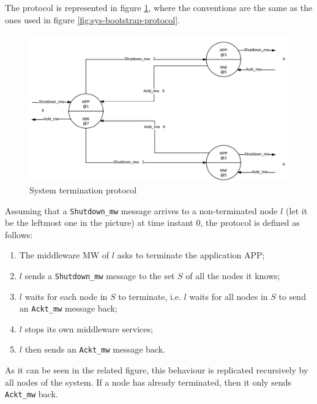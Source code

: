 The protocol is represented in figure \ref{fig:sys-termination-protocol}, where
the conventions are the same as the ones used in figure
\ref{fig:sys-bootstrap-protocol}.

\begin{figure}[H]
  \centering
  \includegraphics[width=\columnwidth]{sections/images/solution/termination.pdf}
  \caption{System termination protocol}
  \label{fig:sys-termination-protocol}
\end{figure}

Assuming that a \texttt{Shutdown\_mw} message arrives to a non-terminated node
$l$ (let it be the leftmost one in the picture) at time instant 0, the protocol
is defined as follows:

\begin{enumerate}
  \item The middleware MW of $l$ asks to terminate the application APP;
  \item $l$ sends a \texttt{Shutdown\_mw} message to the set
    $S$ of all the nodes it knows;
  \item $l$ waits for each node in $S$ to terminate, i.e. $l$ waits for all
    nodes in $S$ to send an \texttt{Ackt\_mw} message back;
  \item $l$ stops its own middleware services;
  \item $l$ then sends an \texttt{Ackt\_mw} message back.
\end{enumerate}

As it can be seen in the related figure, this behaviour is replicated
recursively by all nodes of the system. If a node has already terminated, then
it only sends \texttt{Ackt\_mw} back.
